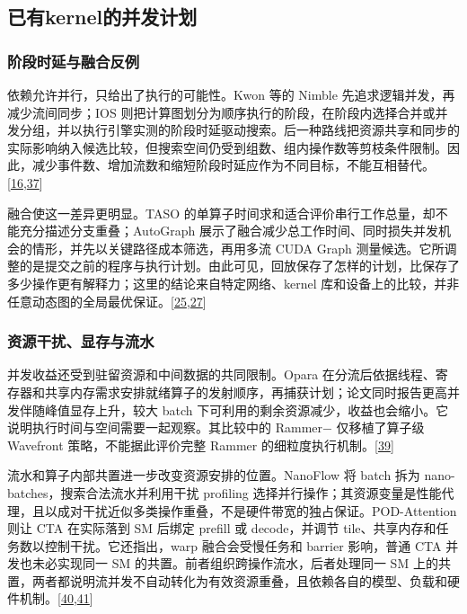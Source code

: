 \documentclass[
  UTF8,
  zihao=5]{ctexart}
\begin{document}
\hypertarget{ux5df2ux6709kernelux7684ux5e76ux53d1ux8ba1ux5212}{%
\subsection{已有kernel的并发计划}\label{ux5df2ux6709kernelux7684ux5e76ux53d1ux8ba1ux5212}}

\hypertarget{ux9636ux6bb5ux65f6ux5ef6ux4e0eux878dux5408ux53cdux4f8b}{%
\subsubsection{阶段时延与融合反例}\label{ux9636ux6bb5ux65f6ux5ef6ux4e0eux878dux5408ux53cdux4f8b}}

依赖允许并行，只给出了执行的可能性。Kwon 等的 Nimble
先追求逻辑并发，再减少流间同步；IOS
则把计算图划分为顺序执行的阶段，在阶段内选择合并或并发分组，并以执行引擎实测的阶段时延驱动搜索。后一种路线把资源共享和同步的实际影响纳入候选比较，但搜索空间仍受到组数、组内操作数等剪枝条件限制。因此，减少事件数、增加流数和缩短阶段时延应作为不同目标，不能互相替代。{[}\protect\hyperlink{ref-kwon2020nimble}{16},\protect\hyperlink{ref-ding2021ios}{37}{]}

融合使这一差异更明显。TASO
的单算子时间求和适合评价串行工作总量，却不能充分描述分支重叠；AutoGraph
展示了融合减少总工作时间、同时损失并发机会的情形，并先以关键路径成本筛选，再用多流
CUDA Graph
测量候选。它所调整的是提交之前的程序与执行计划。由此可见，回放保存了怎样的计划，比保存了多少操作更有解释力；这里的结论来自特定网络、kernel
库和设备上的比较，并非任意动态图的全局最优保证。{[}\protect\hyperlink{ref-jia2019taso}{25},\protect\hyperlink{ref-zhao2023autograph}{27}{]}

\hypertarget{ux8d44ux6e90ux5e72ux6270ux663eux5b58ux4e0eux6d41ux6c34}{%
\subsubsection{资源干扰、显存与流水}\label{ux8d44ux6e90ux5e72ux6270ux663eux5b58ux4e0eux6d41ux6c34}}

并发收益还受到驻留资源和中间数据的共同限制。Opara
在分流后依据线程、寄存器和共享内存需求安排就绪算子的发射顺序，再捕获计划；论文同时报告更高并发伴随峰值显存上升，较大
batch
下可利用的剩余资源减少，收益也会缩小。它说明执行时间与空间需要一起观察。其比较中的
Rammer− 仅移植了算子级 Wavefront 策略，不能据此评价完整 Rammer
的细粒度执行机制。{[}\protect\hyperlink{ref-chen2025opara}{39}{]}

流水和算子内部共置进一步改变资源安排的位置。NanoFlow 将 batch 拆为
nano-batches，搜索合法流水并利用干扰 profiling
选择并行操作；其资源变量是性能代理，且以成对干扰近似多类操作重叠，不是硬件带宽的独占保证。POD-Attention
则让 CTA 在实际落到 SM 后绑定 prefill 或 decode，并调节
tile、共享内存和任务数以控制干扰。它还指出，warp 融合会受慢任务和
barrier 影响，普通 CTA 并发也未必实现同一 SM
的共置。前者组织跨操作流水，后者处理同一 SM
上的共置，两者都说明流并发不自动转化为有效资源重叠，且依赖各自的模型、负载和硬件机制。{[}\protect\hyperlink{ref-zhu2025nanoflow}{40},\protect\hyperlink{ref-kamath2025pod}{41}{]}
\end{document}
